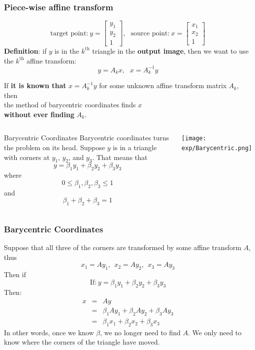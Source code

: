 \documentclass{beamer}
\begin{document}
\begin{frame}
  \frametitle{Piece-wise affine transform}
  \[
  \mbox{target point:}~y=\left[\begin{array}{c}y_1\\y_2\\1\end{array}\right],~~~
  \mbox{source point:}~x=\left[\begin{array}{c}x_1\\x_2\\1\end{array}\right]
  \]
  {\bf Definition}: if $y$ is in the $k^{\textrm{th}}$ triangle in the
  {\bf output image}, then we want to use the $k^{\textrm{th}}$ affine
  transform:
  \[
  y=A_k x,~~~x=A_k^{-1}y
  \]
\end{frame}

\begin{frame}
  If {\bf it is known that} $x=A_k^{-1}y$ for some unknown
  affine transform matrix $A_k$,
  \vspace*{2mm}\\
  then
  \vspace*{2mm}\\
  the method of barycentric
  coordinates finds $x$
  \vspace*{2mm}\\
  {\bf without ever finding} $A_k$.
\end{frame}

\begin{frame}
  \begin{columns}[t]
    \column{2.5in}
    \begin{block}{Barycentric Coordinates}
    Barycentric coordinates turns the problem on its head.  Suppose
    $y$ is in a triangle with corners at $y_1$,
    $y_2$, and $y_3$. That means that
    \[
    y=\beta_1y_1+\beta_2y_2+\beta_3y_3
    \]
    where
    \[
    0\le \beta_1,\beta_2,\beta_3\le 1
    \]
    and
    \[
    \beta_1+\beta_2+\beta_3=1
    \]
    \end{block}
    \column{2.25in}
    \begin{block}{}
      \centerline{\texttt{[image: exp/Barycentric.png]}}
    \end{block}
  \end{columns}
\end{frame}

\begin{frame}
  \frametitle{Barycentric Coordinates}
  Suppose that all three of the corners are 
  transformed by some affine transform $A$, thus
  \[
  x_1=Ay_1,~~
  x_2=Ay_2,~~
  x_3=Ay_3
  \]
  Then if
  \[
  \mbox{If:}~y=\beta_1y_1+\beta_2y_2+\beta_3y_3
  \]
  Then:
  \begin{eqnarray*}
    x &=& Ay\\
    &=& \beta_1Ay_1+\beta_2Ay_2+\beta_3Ay_3\\
    &=& \beta_1x_1+\beta_2x_2+\beta_3x_3
  \end{eqnarray*}
  In other words, once we know $\beta$, we no longer need to
  find $A$.  We only need to know where the corners of the triangle
  have moved.
\end{frame}
\end{document}
